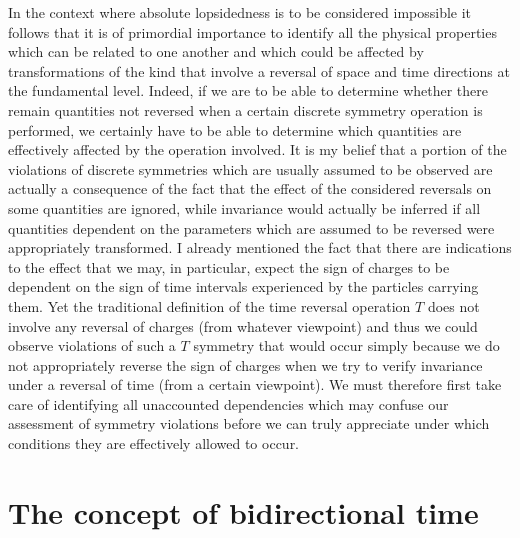 \documentclass[notitlepage,12pt]{report}
\begin{document}
In the context where absolute lopsidedness is to be considered impossible it follows that it is of primordial importance to identify all the physical properties which can be related to one another and which could be affected by transformations of the kind that involve a reversal of space and time directions at the fundamental level. Indeed, if we are to be able to determine whether there remain quantities not reversed when a certain discrete symmetry operation is performed, we certainly have to be able to determine which quantities are effectively affected by the operation involved. It is my belief that a portion of the violations of discrete symmetries which are usually assumed to be observed are actually a consequence of the fact that the effect of the considered reversals on some quantities are ignored, while invariance would actually be inferred if all quantities dependent on the parameters which are assumed to be reversed were appropriately transformed. I already mentioned the fact that there are indications to the effect that we may, in particular, expect the sign of charges to be dependent on the sign of time intervals experienced by the particles carrying them. Yet the traditional definition of the time reversal operation $T$ does not involve any reversal of charges (from whatever viewpoint) and thus we could observe violations of such a $T$ symmetry that would occur simply because we do not appropriately reverse the sign of charges when we try to verify invariance under a reversal of time (from a certain viewpoint). We must therefore first take care of identifying all unaccounted dependencies which may confuse our assessment of symmetry violations before we can truly appreciate under which conditions they are effectively allowed to occur.

\section{The concept of bidirectional time}
\end{document}
